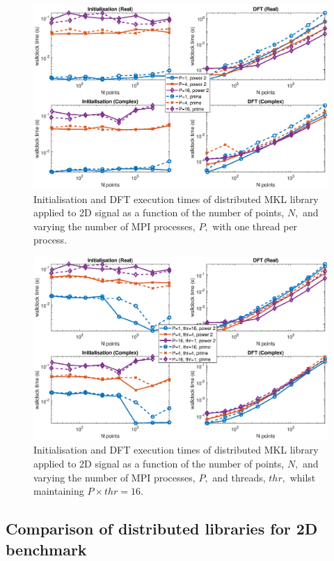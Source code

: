\documentclass[a4paper]{article}
\begin{document}
\begin{figure}[htb]
    \centering
    \includegraphics[width=\linewidth]{../results/mkl_2d_mpi.eps}
  \caption{Initialisation and DFT execution times of distributed MKL library applied to 2D signal as a function of the
    number of points, $N,$ and varying the number of MPI processes, $P,$ with one thread per process.}
  \label{2DDistMKL}
\end{figure}

\begin{figure}[htb]
    \centering
    \includegraphics[width=\linewidth]{../results/mkl_2d_mpi_thr.eps}
  \caption{Initialisation and DFT execution times of distributed MKL library applied to 2D signal as a function of the
    number of points, $N,$ and varying the number of MPI processes, $P,$ and threads, $thr,$ whilst maintaining $P\times thr=16.$}
  \label{2DDistMKL16}
\end{figure}

\subsection{Comparison of distributed libraries for 2D benchmark}\label{Sec:2DDistComp}
\end{document}
